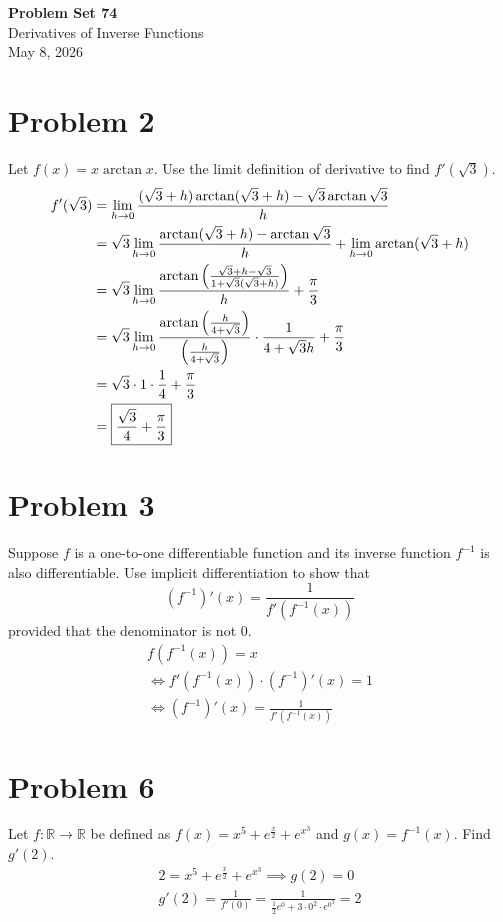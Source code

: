 \documentclass[12pt]{article}
\newcommand*{\paren}[1]{\ensuremath\left(#1\right)}
\newcommand{\problem}[1]{\section{Problem #1}}
\begin{document}
\vspace*{0cm}

\begin{center}
    {\Large \bfseries Problem Set 74} \\[0.5cm]
    {\large Derivatives of Inverse Functions} \\[0.35cm]
    {\normalsize May 8, 2026}
\end{center}


\problem{2}
Let $f(x) = x \arctan x$. Use the limit definition of derivative to find $f'(\sqrt{3})$.
\begin{align*}
    f'(\sqrt{3})
    &=\lim_{h \to 0}\frac{(\sqrt{3}+h)\arctan (\sqrt{3}+h)-\sqrt{3}\arctan \sqrt{3}}{h}\\
    &=\sqrt{3}\lim_{h \to 0} \frac{\arctan (\sqrt{3}+h)-\arctan \sqrt{3}}{h}+\lim_{h \to 0} \arctan     (\sqrt3+h)\\
    &=\sqrt{3}\lim_{h \to 0}\frac{\arctan \paren{\frac{\sqrt{3}+h-\sqrt{3}}{1+\sqrt{3}(\sqrt{3}+h)}}}{h}+\frac{\pi}{3}\\
    &=\sqrt{3}\lim_{h \to 0}\frac{\arctan \paren{\frac{h}{4+\sqrt{3}}}}{\paren{\frac{h}{4+\sqrt{3}}}}\cdot \frac{1}{4+\sqrt{3}h}+\frac{\pi}{3}\\
    &=\sqrt{3}\cdot 1 \cdot \frac{1}{4}+\frac{\pi}{3}\\
    &=\boxed{\frac{\sqrt{3}}{4}+\frac{\pi}{3}}
\end{align*}

\problem{3}
Suppose $f$ is a one-to-one differentiable function and its inverse function $f^{-1}$
is also differentiable. Use
implicit differentiation to show that
\[
(f^{-1})'(x)=\frac{1}{f'(f^{-1}(x))}
\]
provided that the denominator is not 0.
\begin{gather*}
    f(f^{-1}(x))=x\\
    \iff f'(f^{-1}(x))\cdot (f^{-1})'(x)=1\\
    \iff \boxed{(f^{-1})'(x)=\frac{1}{f'(f^{-1}(x))}}
\end{gather*}

\problem{6}
Let $f:\mathbb{R}\to \mathbb{R}$ be defined as $f(x)=x^5+e^{\frac{x}{2}}+e^{x^3}$ and $g(x)=f^{-1}(x)$. Find $g'(2)$.
\begin{gather*}
   2=x^5+e^{\frac{x}{2}}+e^{x^3} \implies  g(2)=0\\
   g'(2)=\frac{1}{f'(0)}=\frac{1}{\frac{1}{2}e^0+3\cdot0^2\cdot e^{0^3}}=\boxed{2}
\end{gather*}
\end{document}
